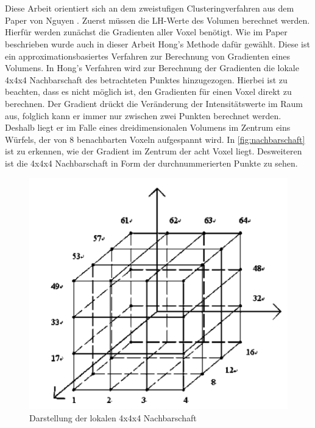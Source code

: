 \chapter{}
\label{sec:methods}


Diese Arbeit orientiert sich an dem zweistufigen Clusteringverfahren aus dem Paper von Nguyen \cite{nguyen2012clustering}. 
\newline
Zuerst müssen die LH-Werte des Volumen berechnet werden. Hierfür werden zunächst die Gradienten aller Voxel benötigt. Wie im Paper beschrieben wurde auch in dieser Arbeit Hong's Methode \cite{hong2003method} dafür gewählt.
Diese ist ein approximationsbasiertes Verfahren zur Berechnung von Gradienten eines Volumens. 
\newline
In Hong's Verfahren wird zur Berechnung der Gradienten die lokale 4x4x4 Nachbarschaft des betrachteten Punktes hinzugezogen. Hierbei ist zu beachten, dass es nicht möglich ist, den Gradienten für einen Voxel direkt zu berechnen. Der Gradient drückt die Veränderung der Intensitätswerte im Raum aus, folglich kann er immer nur zwischen zwei Punkten berechnet werden. Deshalb liegt er im Falle eines dreidimensionalen Volumens im Zentrum eins Würfels, der von 8 benachbarten Voxeln aufgespannt wird. In \autoref{fig:nachbarschaft} ist zu erkennen, wie der Gradient im Zentrum der acht Voxel liegt. Desweiteren ist die 4x4x4 Nachbarschaft in Form der durchnummerierten Punkte zu sehen.
\newline

\begin{figure}[!h] 
\centering 
\includegraphics[width=\textwidth]{Logos/VoxelEdges.PNG}
\caption{Darstellung der lokalen 4x4x4 Nachbarschaft} 
\label{fig:nachbarschaft} 
\end{figure}




